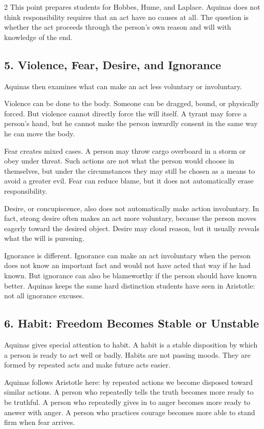 \documentclass[12pt]{article}
\begin{document}
\begin{multicols}{2}
This point prepares students for Hobbes, Hume, and Laplace. Aquinas does not think responsibility requires that an act have no causes at all. The question is whether the act proceeds through the person's own reason and will with knowledge of the end.

\subsection*{5. Violence, Fear, Desire, and Ignorance}
Aquinas then examines what can make an act less voluntary or involuntary.

Violence can be done to the body. Someone can be dragged, bound, or physically forced. But violence cannot directly force the will itself. A tyrant may force a person's hand, but he cannot make the person inwardly consent in the same way he can move the body.

Fear creates mixed cases. A person may throw cargo overboard in a storm or obey under threat. Such actions are not what the person would choose in themselves, but under the circumstances they may still be chosen as a means to avoid a greater evil. Fear can reduce blame, but it does not automatically erase responsibility.

Desire, or concupiscence, also does not automatically make action involuntary. In fact, strong desire often makes an act more voluntary, because the person moves eagerly toward the desired object. Desire may cloud reason, but it usually reveals what the will is pursuing.

Ignorance is different. Ignorance can make an act involuntary when the person does not know an important fact and would not have acted that way if he had known. But ignorance can also be blameworthy if the person should have known better. Aquinas keeps the same hard distinction students have seen in Aristotle: not all ignorance excuses.

\subsection*{6. Habit: Freedom Becomes Stable or Unstable}
Aquinas gives special attention to habit. A habit is a stable disposition by which a person is ready to act well or badly. Habits are not passing moods. They are formed by repeated acts and make future acts easier.

Aquinas follows Aristotle here: by repeated actions we become disposed toward similar actions. A person who repeatedly tells the truth becomes more ready to be truthful. A person who repeatedly gives in to anger becomes more ready to answer with anger. A person who practices courage becomes more able to stand firm when fear arrives.


\end{multicols}
\end{document}
